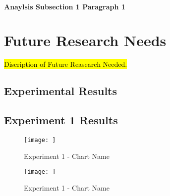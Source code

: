 \documentclass{article}
\begin{document}
\paragraph{Anaylsis Subsection 1 Paragraph 1} \mbox{}

\section{Future Research Needs}

\hl{Discription of Future Reasearch Needed.}




\printbibliography

\clearpage

\begin{appendices}

\section{Experimental Results} \label{App:Results}
\renewcommand{\thesubsection}{\Alph{section}}

\clearpage		\large
\subsection{Experiment 1 Results} \label{App:Exp1Results} 

\begin{figure}[h!]
	\centering
	\texttt{[image: ]}
	\caption{Experiment 1 - Chart Name}
\end{figure}


\begin{figure}[h!]
	\centering
	\texttt{[image: ]}
	\caption{Experiment 1 - Chart Name}
\end{figure}

\clearpage

\end{appendices}
\end{document}
